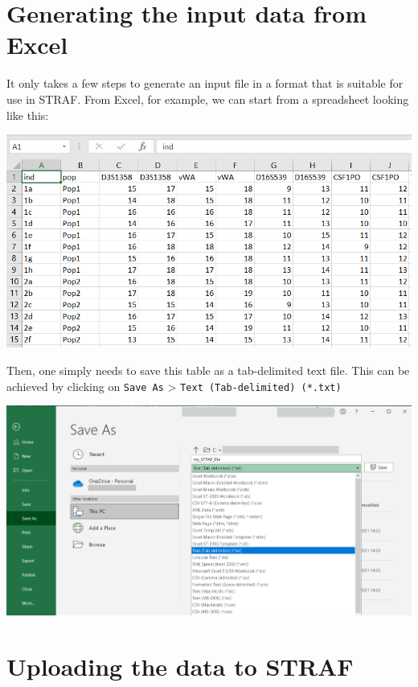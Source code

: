 \documentclass[
]{book}
\begin{document}
\hypertarget{generating-the-input-data-from-excel}{%
\section{Generating the input data from Excel}\label{generating-the-input-data-from-excel}}

It only takes a few steps to generate an input file in a format that is suitable
for use in STRAF. From Excel, for example, we can start from a spreadsheet looking
like this:

\includegraphics[width=1\linewidth]{img/capture_excel_1}

Then, one simply needs to save this table as a tab-delimited text file. This can be
achieved by clicking on \texttt{Save\ As} \textgreater{} \texttt{Text\ (Tab-delimited)\ (*.txt)}

\includegraphics[width=1\linewidth]{img/capture_excel_2}

\hypertarget{uploading-the-data-to-straf}{%
\section{Uploading the data to STRAF}\label{uploading-the-data-to-straf}}
\end{document}

